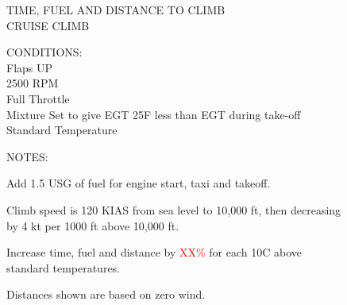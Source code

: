 \begin{figure}[t]
\begin{center}
\begin{perfhdr}TIME, FUEL AND DISTANCE TO CLIMB\\
CRUISE CLIMB\\
\end{perfhdr}
\Large
\normalsize
\vspace{5ex}
    \raggedright 
    CONDITIONS:\\
    Flaps UP\\
    2500 RPM\\
    Full Throttle\\
    Mixture Set to give EGT 25\textdegree F less than EGT during take-off\\
    Standard Temperature\\
\hfill

\vspace{\perfnoteskip}
    \raggedright NOTES:
    \begin{enumerate*}
      \item Add 1.5 USG of fuel for engine start, taxi and takeoff.
      \item Climb speed is 120 KIAS from sea level to 10,000 ft, then decreasing by 4 kt per 1000 ft above 10,000 ft.
      \item Increase time, fuel and distance by \textcolor{red}{XX\%} for each 10\textdegree C above standard temperatures.
      \item Distances shown are based on zero wind.
      \end{enumerate*}
\vspace{\perfnoteskip}
\settowidth{\colOne}{WEIGHT}
\settowidth{\colTwo}{PRESSURE}
\settowidth{\colThree}{TEMP}
\settowidth{\colFour}{CLIMB}
\settowidth{\colFive}{RATE OF}
\settowidth{\colSix}{TIME}
\settowidth{\colSeven}{USED}
\settowidth{\colEight}{DIST.}


\end{center}
\end{figure}
